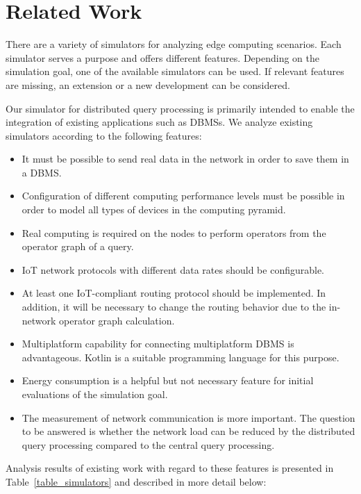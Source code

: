 \documentclass[english,version-2019-11]{uzl-thesis}
\begin{document}
\section{Related Work}

%
There are a variety of simulators for analyzing edge computing scenarios. Each simulator serves a purpose and offers different features. Depending on the simulation goal, one of the available simulators can be used. If relevant features are missing, an extension or a new development can be considered. 

Our simulator for distributed query processing is primarily intended to enable the integration of existing applications such as DBMSs. We analyze existing simulators according to the following features:
\begin{itemize}
 \item It must be possible to send real data in the network in order to save them in a DBMS.
 \item Configuration of different computing performance levels must be possible in order to model all types of devices in the computing pyramid.
 \item Real computing is required on the nodes to perform operators from the operator graph of a query.
 \item IoT network protocols with different data rates should be configurable.
 \item At least one IoT-compliant routing protocol should be implemented. In addition, it will be necessary to change the routing behavior due to the in-network operator graph calculation.
 \item Multiplatform capability for connecting multiplatform DBMS is advantageous. Kotlin is a suitable programming language for this purpose.
 \item Energy consumption is a helpful but not necessary feature for initial evaluations of the simulation goal.
 \item The measurement of network communication is more important. The question to be answered is whether the network load can be reduced by the distributed query processing compared to the central query processing.
\end{itemize}
Analysis results of existing work with regard to these features is presented in Table~\ref{table_simulators} and described in more detail below:
\end{document}
